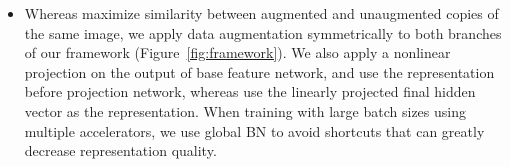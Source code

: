 \documentclass{article}
\begin{document}
\begin{itemize}
    \item Whereas \citet{ye2019unsupervised} maximize similarity between augmented and unaugmented copies of the same image, we apply data augmentation symmetrically to both branches of our framework (Figure~\ref{fig:framework}). We also apply a nonlinear projection on the output of base feature network, and use the representation before projection network, whereas \citet{ye2019unsupervised} use the linearly projected final hidden vector as the representation. When training with large batch sizes using multiple accelerators, we use global BN to avoid shortcuts that can greatly decrease representation quality.
\end{itemize}

 
\end{document}

